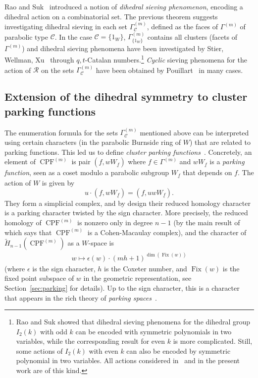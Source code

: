 \documentclass[11pt]{article}
\theoremstyle{definition}
\newcommand{\CC}{\mathcal{C}}
\newcommand{\RR}{\mathcal{R}}
\DeclareMathOperator{\Fix}{Fix}
\DeclareMathOperator{\CPF}{CPF}
\begin{document}
Rao and Suk~\cite{raosuk} introduced a notion of {\it dihedral sieving phenomenon}, encoding a dihedral action on a combinatorial set.  The previous theorem suggests investigating dihedral sieving in each set $\Gamma^{(m)}_{\CC}$, defined as the faces of $\Gamma^{(m)}$ of parabolic type $\CC$.  In the case $\CC = \{1_W\}$, $\Gamma^{(m)}_{\{1_W\}}$ contains all clusters (facets of $\Gamma^{(m)}$) and dihedral sieving phenomena have been investigated by Stier, Wellman, Xu~\cite{stierwellmanxu} through $q,t$-Catalan numbers.\footnote{Rao and Suk showed that dihedral sieving phenomena for the dihedral group $I_2(k)$ with odd $k$ can be encoded with symmetric polynomials in two variables, while the corresponding result for even $k$ is more complicated. Still, some actions of $I_2(k)$ with even $k$ can also be encoded by symmetric polynomial in two variables.  All actions considered in~\cite{stierwellmanxu} and in the present work are of this kind.}  {\it Cyclic} sieving phenomena for the action of $\RR$ on the sets $\Gamma^{(m)}_{\CC}$ have been obtained by Pouillart~\cite{pouillart1} in many cases.


\subsection{Extension of the dihedral symmetry to cluster parking functions}

The enumeration formula for the sets $\Gamma^{(m)}_\CC$ mentioned above can be interpreted using certain characters (in the parabolic Burnside ring of $W$) that are related to parking functions.  This led us to define {\it cluster parking functions}~\cite{douvropoulosjosuatverges2}. Concretely, an element of $\CPF^{(m)}$ is pair $(f,w W_{\underline{f}})$ where $f \in \Gamma^{(m)}$ and $w W_{\underline{f}}$ is a {\it parking function}, seen as a coset modulo a parabolic subgroup $W_{\underline{f}}$ that depends on $f$.  The action of $W$ is given by
\[
    u \cdot ( f, wW_{\underline{f}} ) 
    = 
    ( f, uwW_{\underline{f}} ).
\]
They form a simplicial complex, and by design their reduced homology character is a parking character twisted by the sign character.  More precisely, the reduced homology of $\CPF^{(m)}$ is nonzero only in degree $n-1$ (by the main result of~\cite{douvropoulosjosuatverges2} which says that $\CPF^{(m)}$ is a Cohen-Macaulay complex), and the  character of $\tilde H_{n-1}(\CPF^{(m)})$ as a $W$-space is
\begin{align}\label{eq:char_rw}
    w \mapsto \epsilon(w)\cdot (mh+1)^{\dim(\Fix(w))}
\end{align}
(where $\epsilon$ is the sign character, $h$ is the Coxeter number, and $\Fix(w)$ is the fixed point subspace of $w$ in the geometric representation, see Section~\ref{sec:parking} for details).  Up to the sign character, this is a character that appears in the rich theory of {\it parking spaces}~\cite{armstrongreinerrhoades,rhoades}.
\end{document}
